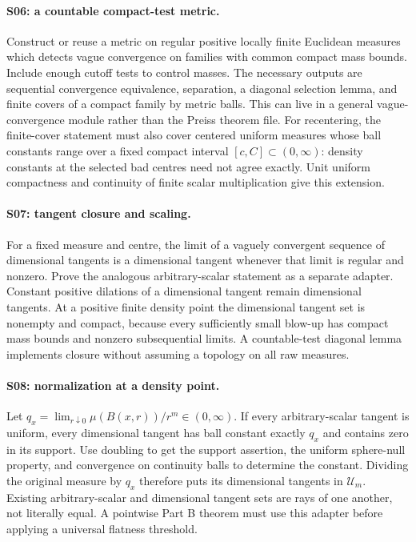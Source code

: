 \paragraph{S06: a countable compact-test metric.}
Construct or reuse a metric on regular positive locally finite Euclidean
measures which detects vague convergence on families with common compact mass
bounds. Include enough cutoff tests to control masses. The necessary outputs are
sequential convergence equivalence, separation, a diagonal selection lemma,
and finite covers of a compact family by metric balls. This can live in a
general vague-convergence module rather than the Preiss theorem file.
For recentering, the finite-cover statement must also cover centered uniform
measures whose ball constants range over a fixed compact interval
$[c,C]\subset(0,\infty)$: density constants at the selected bad centres need
not agree exactly. Unit uniform compactness and continuity of finite scalar
multiplication give this extension.

\paragraph{S07: tangent closure and scaling.}
For a fixed measure and centre, the limit of a vaguely convergent sequence of
dimensional tangents is a dimensional tangent whenever that limit is regular
and nonzero. Prove the analogous arbitrary-scalar statement as a separate
adapter. Constant positive dilations of a dimensional tangent remain dimensional
tangents. At a positive finite density point the dimensional tangent set is
nonempty and compact, because every sufficiently small blow-up has compact
mass bounds and nonzero subsequential limits. A countable-test diagonal lemma
implements closure without assuming a topology on all raw measures.

\paragraph{S08: normalization at a density point.}
Let $q_x=\lim_{r\downarrow0}\mu(B(x,r))/r^m\in(0,\infty)$.
If every arbitrary-scalar tangent is uniform, every dimensional tangent
has ball constant exactly $q_x$ and contains zero in its support.
Use doubling to get the support assertion, the uniform sphere-null property,
and convergence on continuity balls to determine the constant. Dividing the
original measure by $q_x$ therefore puts its dimensional tangents in
$\mathcal U_m$. Existing arbitrary-scalar and dimensional tangent sets are rays
of one another, not literally equal. A pointwise Part B theorem must use this
adapter before applying a universal flatness threshold.

